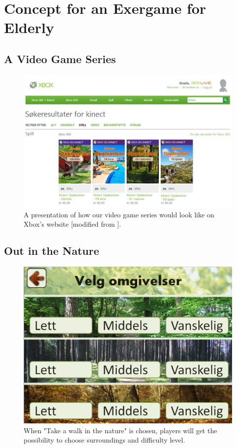 \chapter{Concept for an Exergame for Elderly}


\section{A Video Game Series}
\begin{figure} [ht!]
\centering
\includegraphics[scale=0.5, angle=90]{SpillXboxNYNY.jpg}
\caption[Presentation of our video game series]{A presentation of how our video game series would look like on Xbox's website [modified from \cite{XboxNettside}].}
\label{fig:videogameseriesHele}
\end{figure}



\section{Out in the Nature}

\begin{figure} [ht!]
\centering
\includegraphics[scale=0.45]{VelgOmgivelser.jpg}
\caption[Choice of surroundings and difficulty]{When "Take a walk in the nature" is chosen, players will get the possibility to choose surroundings and difficulty level.}
\label{fig:omgivelseNivaa}
\end{figure}

